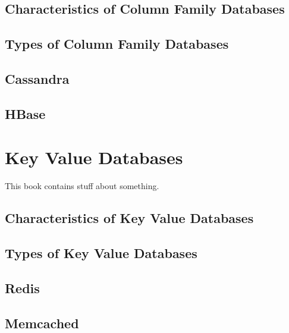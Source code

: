 \section{Characteristics of Column Family Databases}
\section{Types of Column Family Databases}
\section{Cassandra}
\section{HBase}

\chapter{Key Value Databases}
\label{chap:nosql:keyvaluedatabases}
This book contains stuff about something.

\section{Characteristics of Key Value Databases}
\section{Types of Key Value Databases}
\section{Redis}
\section{Memcached}




